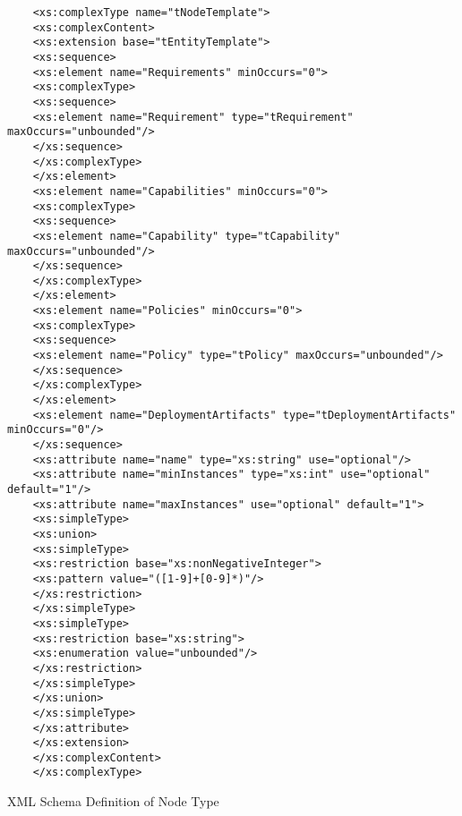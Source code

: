 \begin{Listing}
	\begin{lstlisting}
	<xs:complexType name="tNodeTemplate">
	<xs:complexContent>
	<xs:extension base="tEntityTemplate">
	<xs:sequence>
	<xs:element name="Requirements" minOccurs="0">
	<xs:complexType>
	<xs:sequence>
	<xs:element name="Requirement" type="tRequirement" maxOccurs="unbounded"/>
	</xs:sequence>
	</xs:complexType>
	</xs:element>
	<xs:element name="Capabilities" minOccurs="0">
	<xs:complexType>
	<xs:sequence>
	<xs:element name="Capability" type="tCapability" maxOccurs="unbounded"/>
	</xs:sequence>
	</xs:complexType>
	</xs:element>
	<xs:element name="Policies" minOccurs="0">
	<xs:complexType>
	<xs:sequence>
	<xs:element name="Policy" type="tPolicy" maxOccurs="unbounded"/>
	</xs:sequence>
	</xs:complexType>
	</xs:element>
	<xs:element name="DeploymentArtifacts" type="tDeploymentArtifacts" minOccurs="0"/>
	</xs:sequence>
	<xs:attribute name="name" type="xs:string" use="optional"/>
	<xs:attribute name="minInstances" type="xs:int" use="optional" default="1"/>
	<xs:attribute name="maxInstances" use="optional" default="1">
	<xs:simpleType>
	<xs:union>
	<xs:simpleType>
	<xs:restriction base="xs:nonNegativeInteger">
	<xs:pattern value="([1-9]+[0-9]*)"/>
	</xs:restriction>
	</xs:simpleType>
	<xs:simpleType>
	<xs:restriction base="xs:string">
	<xs:enumeration value="unbounded"/>
	</xs:restriction>
	</xs:simpleType>
	</xs:union>
	</xs:simpleType>
	</xs:attribute>
	</xs:extension>
	</xs:complexContent>
	</xs:complexType>
	\end{lstlisting}
	\caption{XML Schema Definition of Node Type}
	\label{lst:xsdnodetype}
\end{Listing}
		

